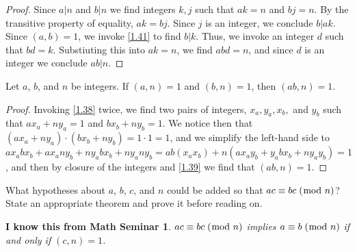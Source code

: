 \documentclass[../main.tex]{subfiles}
\begin{document}
\begin{proof}
  Since $a | n$ and $b | n$ we find integers $k, j$ such that $ak = n$ and $bj = n$. By the transitive property of equality, $ak = bj$. Since $j$ is an integer, we conclude $b | ak$. Since $(a, b) = 1$, we invoke \ref{1.41} to find $b | k$. Thus, we invoke an integer $d$ such that $bd = k$. Substiuting this into $ak = n$, we find $abd = n$, and since $d$ is an integer we conclude $ab | n$.
\end{proof}



\begin{thm} \label{1.43}
  Let $a$, $b$, and $n$ be integers. If $(a,n) = 1$ and $(b, n) = 1$, then $(ab, n) = 1$.
\end{thm}

\begin{proof}
  Invoking \ref{1.38} twice, we find two pairs of integers, $x_a, y_a, x_b,$ and $y_b$ such that $ax_a + ny_a = 1$ and $bx_b + ny_b = 1$. We notice then that $(ax_a + ny_a) \cdot (bx_b + ny_b) = 1 \cdot 1 = 1$, and we simplify the left-hand side to $ax_abx_b + ax_any_b + ny_abx_b + ny_any_b = ab(x_a x_b) + n(ax_a y_b + y_a b x_b + ny_a y_b) = 1$, and then by closure of the integers and \ref{1.39} we find that $(ab, n) = 1$.
\end{proof}



\begin{ques} \label{1.44}
  What hypotheses about $a$, $b$, $c$, and $n$ could be added so that $ac \equiv bc \; (\bmod \; n)$? State an appropriate theorem and prove it before reading on.
\end{ques}

\newtheorem*{IKFMS}{I know this from Math Seminar}
\begin{IKFMS}
  $ac \equiv bc \; (\bmod \; n)$ implies $a \equiv b \; (\bmod \; n)$ if and only if $(c, n) = 1$.
\end{IKFMS}
\end{document}
